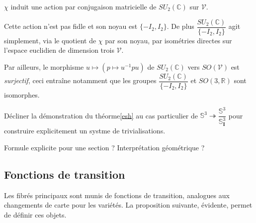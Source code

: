 \begin{rema}
$\chi$ induit une action par conjugaison matricielle de $SU_2(\mathbb{C})$ sur $\mathcal{V}$.
\par
Cette action n'est pas fidle et son noyau est $\{-I_2,I_2\}$. %
De plus $\dfrac{SU_2(\mathbb{C})}{\{-I_2,I_2\}}$ agit simplement, via le quotient de $\chi$ par son noyau, %
par isom\'etries directes sur l'espace euclidien de dimension trois $\mathcal{V}$.
\par
Par ailleurs, le morphisme $u\mapsto \left(p\mapsto u^{-1}pu\right)$ de $SU_2(\mathbb{C})$ vers $SO(\mathcal{V})$ est \emph{surjectif}, %
ceci entra\^ine notamment que les groupes $\dfrac{SU_2(\mathbb{C})}{\{-I_2,I_2\}}$ et $SO(3,\mathbb{R})$ sont isomorphes.
\end{rema}

\etoile

D\'ecliner la d\'emonstration du th\'eorme\ref{esh} au cas particulier de $\mathbb{S}^3\twoheadrightarrow\dfrac{\mathbb{S}^3}{\mathbb{S}^3_{\mathbf{I}}}$ %
pour construire explicitement un systme de trivialisations.
\par
Formule explicite pour une section ? Interpr\'etation g\'eom\'etrique ?

\subsection{Fonctions de transition}

Les fibrés principaux sont munis de fonctions de transition, analogues aux changements de carte pour les variétés. La proposition suivante, évidente, permet de définir ces objets.

